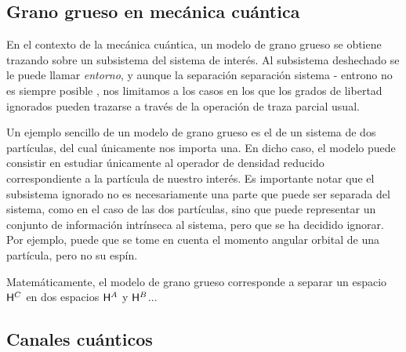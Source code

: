 \subsection{Grano grueso en mecánica cuántica}

En el contexto de la mecánica cuántica, un modelo de grano grueso se obtiene trazando sobre un subsistema del sistema de interés. Al subsistema deshechado se le puede llamar \textit{entorno}, y aunque la separación separación sistema - entrono no es siempre posible \cite{Macro-To-Micro}, nos limitamos a los casos en los que los grados de libertad ignorados pueden trazarse a través de la operación de traza parcial usual.

Un ejemplo sencillo de un modelo de grano grueso es el de un sistema de dos partículas, del cual únicamente nos importa una. En dicho caso, el modelo puede consistir en estudiar únicamente al operador de densidad reducido correspondiente a la partícula de nuestro interés. Es importante notar que el subsistema ignorado no es necesariamente una parte que puede ser separada del sistema, como en el caso de las dos partículas, sino que puede representar un conjunto de información intrínseca al sistema, pero que se ha decidido ignorar. Por ejemplo, puede que se tome en cuenta el momento angular orbital de una partícula, pero no su espín.

Matemáticamente, el modelo de grano grueso corresponde a separar un espacio ${\sf H}^{C}$ en dos espacios ${\sf H}^{A}$ y ${\sf H}^{B}$...


\subsection{Canales cuánticos}

